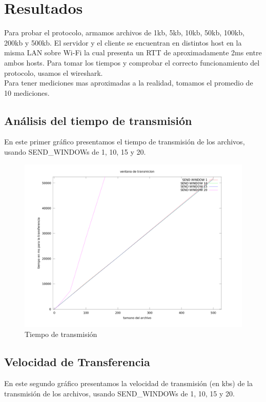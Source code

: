 \newpage
\section{Resultados}
\indent Para probar el protocolo, armamos archivos de 1kb, 5kb, 10kb, 50kb, 100kb, 200kb y
500kb. El servidor y el cliente se encuentran en distintos host en la misma LAN sobre Wi-Fi la cual presenta un RTT de aproximadamente 2ms entre ambos hosts. Para
tomar los tiempos y comprobar el correcto funcionamiento del protocolo, usamos
el wireshark.\\
\indent Para tener mediciones mas aproximadas a la realidad, tomamos el promedio de 10 mediciones.\\

\subsection{Análisis del tiempo de transmisión}
\indent En este primer gráfico presentamos el tiempo de transmisión de los archivos, usando SEND\_WINDOWs de 1, 10, 15 y 20.

\begin{figure}[h]
  \centering                                                       
          \includegraphics[width=500pt]{./datos/graf.png}
          \caption{Tiempo de transmisión}
          \label{fig:tt}
\end{figure}

\clearpage

\subsection{Velocidad de Transferencia}
\indent En este segundo gráfico presentamos la velocidad de transmisión (en kb\/s) de la transmisión de los archivos, usando SEND\_WINDOWs de 1, 10, 15 y 20.

